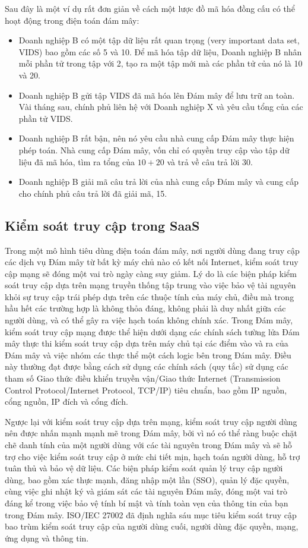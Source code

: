 Sau đây là một ví dụ rất đơn giản về cách một lược đồ mã hóa đồng cấu có thể hoạt động trong điện toán đám mây:

\begin{itemize}
  \item Doanh nghiệp B có một tập dữ liệu rất quan trọng (very important data set, VIDS) bao gồm các số 5 và 10. Để mã hóa tập dữ liệu, Doanh nghiệp B nhân mỗi phần tử trong tập với 2, tạo ra một tập mới mà các phần tử của nó là 10 và 20.
  \item Doanh nghiệp B gửi tập VIDS đã mã hóa lên Đám mây để lưu trữ an toàn. Vài tháng sau, chính phủ liên hệ với Doanh nghiệp X và yêu cầu tổng của các phần tử VIDS.
  \item Doanh nghiệp B rất bận, nên nó yêu cầu nhà cung cấp Đám mây thực hiện phép toán. Nhà cung cấp Đám mây, vốn chỉ có quyền truy cập vào tập dữ liệu đã mã hóa, tìm ra tổng của $10 + 20$ và trả về câu trả lời 30.
  \item Doanh nghiệp B giải mã câu trả lời của nhà cung cấp Đám mây và cung cấp cho chính phủ câu trả lời đã giải mã, 15.
\end{itemize}

\subsection*{Kiểm soát truy cập trong SaaS}

Trong một mô hình tiêu dùng điện toán đám mây, nơi người dùng đang truy cập các dịch vụ Đám mây từ bất kỳ máy chủ nào có kết nối Internet, kiểm soát truy cập mạng sẽ đóng một vai trò ngày càng suy giảm. Lý do là các biện pháp kiểm soát truy cập dựa trên mạng truyền thống tập trung vào việc bảo vệ tài nguyên khỏi sự truy cập trái phép dựa trên các thuộc tính của máy chủ, điều mà trong hầu hết các trường hợp là không thỏa đáng, không phải là duy nhất giữa các người dùng, và có thể gây ra việc hạch toán không chính xác. Trong Đám mây, kiểm soát truy cập mạng được thể hiện dưới dạng các chính sách tường lửa Đám mây thực thi kiểm soát truy cập dựa trên máy chủ tại các điểm vào và ra của Đám mây và việc nhóm các thực thể một cách logic bên trong Đám mây. Điều này thường đạt được bằng cách sử dụng các chính sách (quy tắc) sử dụng các tham số Giao thức điều khiển truyền vận/Giao thức Internet (Transmission Control Protocol/Internet Protocol, TCP/IP) tiêu chuẩn, bao gồm IP nguồn, cổng nguồn, IP đích và cổng đích.

Ngược lại với kiểm soát truy cập dựa trên mạng, kiểm soát truy cập người dùng nên được nhấn mạnh mạnh mẽ trong Đám mây, bởi vì nó có thể ràng buộc chặt chẽ danh tính của một người dùng với các tài nguyên trong Đám mây và sẽ hỗ trợ cho việc kiểm soát truy cập ở mức chi tiết mịn, hạch toán người dùng, hỗ trợ tuân thủ và bảo vệ dữ liệu. Các biện pháp kiểm soát quản lý truy cập người dùng, bao gồm xác thực mạnh, đăng nhập một lần (SSO), quản lý đặc quyền, cùng việc ghi nhật ký và giám sát các tài nguyên Đám mây, đóng một vai trò đáng kể trong việc bảo vệ tính bí mật và tính toàn vẹn của thông tin của bạn trong Đám mây. ISO/IEC 27002 đã định nghĩa sáu mục tiêu kiểm soát truy cập bao trùm kiểm soát truy cập của người dùng cuối, người dùng đặc quyền, mạng, ứng dụng và thông tin.

